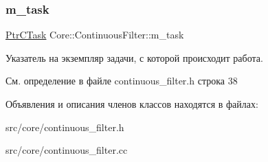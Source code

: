 \subsubsection{\texorpdfstring{m\+\_\+task}{m\_task}}
{\footnotesize\ttfamily \hyperlink{namespace_core_a95543587a560c6c497c6cadf68e03a62}{Ptr\+C\+Task} Core\+::\+Continuous\+Filter\+::m\+\_\+task\hspace{0.3cm}{\ttfamily [protected]}}

Указатель на экземпляр задачи, с которой происходит работа. 

См. определение в файле continuous\+\_\+filter.\+h строка 38



Объявления и описания членов классов находятся в файлах\+:\begin{DoxyCompactItemize}
\item 
src/core/continuous\+\_\+filter.\+h\item 
src/core/continuous\+\_\+filter.\+cc\end{DoxyCompactItemize}
